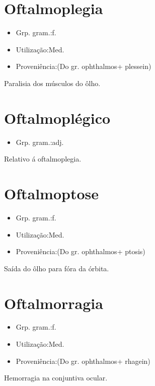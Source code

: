 \section{Oftalmoplegia}
\begin{itemize}
\item {Grp. gram.:f.}
\end{itemize}
\begin{itemize}
\item {Utilização:Med.}
\end{itemize}
\begin{itemize}
\item {Proveniência:(Do gr. \textunderscore ophthalmos\textunderscore  + \textunderscore plessein\textunderscore )}
\end{itemize}
Paralisia dos músculos do ôlho.
\section{Oftalmoplégico}
\begin{itemize}
\item {Grp. gram.:adj.}
\end{itemize}
Relativo á oftalmoplegia.
\section{Oftalmoptose}
\begin{itemize}
\item {Grp. gram.:f.}
\end{itemize}
\begin{itemize}
\item {Utilização:Med.}
\end{itemize}
\begin{itemize}
\item {Proveniência:(Do gr. \textunderscore ophthalmos\textunderscore  + \textunderscore ptosis\textunderscore )}
\end{itemize}
Saída do ôlho para fóra da órbita.
\section{Oftalmorragia}
\begin{itemize}
\item {Grp. gram.:f.}
\end{itemize}
\begin{itemize}
\item {Utilização:Med.}
\end{itemize}
\begin{itemize}
\item {Proveniência:(Do gr. \textunderscore ophthalmos\textunderscore  + \textunderscore rhagein\textunderscore )}
\end{itemize}
Hemorragia na conjuntiva ocular.
